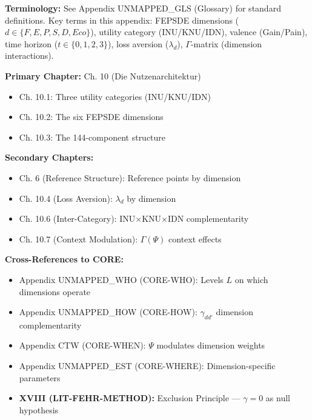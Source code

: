
\begin{tcolorbox}[colback=gray!5!white, colframe=gray!50!black]
\textbf{Terminology:} See Appendix UNMAPPED_GLS (Glossary) for standard definitions.
Key terms in this appendix: FEPSDE dimensions ($d \in \{F,E,P,S,D,Eco\}$),
utility category (INU/KNU/IDN), valence (Gain/Pain), time horizon ($t \in \{0,1,2,3\}$),
loss aversion ($\lambda_d$), $\Gamma$-matrix (dimension interactions).
\end{tcolorbox}

\begin{tcolorbox}[colback=green!5!white, colframe=green!75!black,
    title=\textbf{Chapter References}]

\textbf{Primary Chapter:} Ch. 10 (Die Nutzenarchitektur)
\begin{itemize}[nosep]
    \item Ch. 10.1: Three utility categories (INU/KNU/IDN)
    \item Ch. 10.2: The six FEPSDE dimensions
    \item Ch. 10.3: The 144-component structure
\end{itemize}

\textbf{Secondary Chapters:}
\begin{itemize}[nosep]
    \item Ch. 6 (Reference Structure): Reference points by dimension
    \item Ch. 10.4 (Loss Aversion): $\lambda_d$ by dimension
    \item Ch. 10.6 (Inter-Category): INU$\times$KNU$\times$IDN complementarity
    \item Ch. 10.7 (Context Modulation): $\Gamma(\Psi)$ context effects
\end{itemize}

\textbf{Cross-References to CORE:}
\begin{itemize}[nosep]
    \item Appendix UNMAPPED_WHO (CORE-WHO): Levels $L$ on which dimensions operate
    \item Appendix UNMAPPED_HOW (CORE-HOW): $\gamma_{dd'}$ dimension complementarity
    \item Appendix CTW (CORE-WHEN): $\Psi$ modulates dimension weights
    \item Appendix UNMAPPED_EST (CORE-WHERE): Dimension-specific parameters
    \item \textbf{XVIII (LIT-FEHR-METHOD):} Exclusion Principle --- $\gamma = 0$ as null hypothesis
\end{itemize}

\end{tcolorbox}

